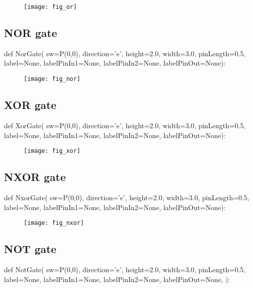 \begin{figure}[!h]
\centerline{\texttt{[image: fig\_or]}}
\end{figure}

\subsection{NOR gate}
\label{func:electronicsNor}
\begin{python}
def NorGate(
        sw=P(0,0),
        direction='e',
        height=2.0,
        width=3.0,
        pinLength=0.5,
        label=None,
        labelPinIn1=None,
        labelPinIn2=None,
        labelPinOut=None):
\end{python}

\begin{figure}[!h]
\centerline{\texttt{[image: fig\_nor]}}
\end{figure}

\subsection{XOR gate}
\label{func:electronicsXor}
\begin{python}
def XorGate(
        sw=P(0,0),
        direction='e',
        height=2.0,
        width=3.0,
        pinLength=0.5,
        label=None,
        labelPinIn1=None,
        labelPinIn2=None,
        labelPinOut=None):
\end{python}

\begin{figure}[!h]
\centerline{\texttt{[image: fig\_xor]}}
\end{figure}

\subsection{NXOR gate}
\label{func:electronicsNxor}
\begin{python}
def NxorGate(
        sw=P(0,0),
        direction='e',
        height=2.0,
        width=3.0,
        pinLength=0.5,
        label=None,
        labelPinIn1=None,
        labelPinIn2=None,
        labelPinOut=None):
\end{python}

\begin{figure}[!h]
\centerline{\texttt{[image: fig\_nxor]}}
\end{figure}

\subsection{NOT gate}
\label{func:electronicsNot}
\begin{python}
def NotGate(
        sw=P(0,0),
        direction='e',
        height=2.0,
        width=3.0,
        pinLength=0.5,
        label=None,
        labelPinIn1=None,
        labelPinIn2=None,
        labelPinOut=None,
        ):
\end{python}

